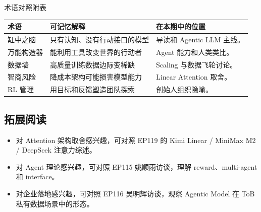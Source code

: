 \documentclass[a4paper]{article}
\begin{document}
\begin{knowledgebox}{术语对照附表}
\begin{tabularx}{\textwidth}{p{}p{}X}
\toprule
术语 & 可记忆解释 & 在本期中的位置 \\
\midrule
缸中之脑 & 只有认知、没有行动接口的模型 & 导读和 Agentic LLM 主线。 \\
万能构造器 & 能利用工具改变世界的行动者 & Agent 能力和人类类比。 \\
数据墙 & 高质量训练数据边际变稀缺 & Scaling 与数据飞轮讨论。 \\
智商风险 & 降成本架构可能损害模型能力 & Linear Attention 取舍。 \\
RL 管理 & 用目标和反馈塑造团队探索 & 创始人组织隐喻。 \\
\bottomrule
\end{tabularx}
\end{knowledgebox}

\subsection{拓展阅读}

\begin{itemize}
\item 对 Attention 架构取舍感兴趣，可对照 EP119 的 Kimi Linear / MiniMax M2 / DeepSeek 注意力综述。
\item 对 Agent 理论感兴趣，可对照 EP115 姚顺雨访谈，理解 reward、multi-agent 和 interface。
\item 对企业落地感兴趣，可对照 EP116 吴明辉访谈，观察 Agentic Model 在 ToB 私有数据场景中的形态。
\end{itemize}
\end{document}
